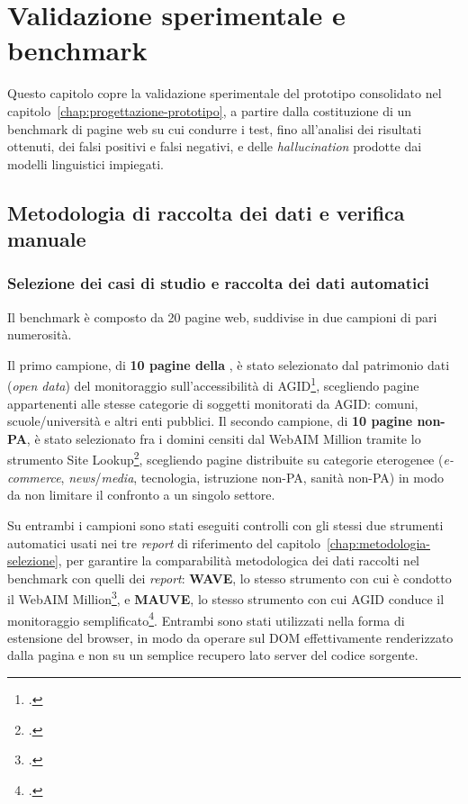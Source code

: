 \chapter{Validazione sperimentale e benchmark}
\label{chap:validazione-benchmark}

Questo capitolo copre la validazione sperimentale del prototipo consolidato nel capitolo~\ref{chap:progettazione-prototipo}, a partire dalla costituzione di un benchmark di pagine web su cui condurre i test, fino all'analisi dei risultati ottenuti, dei falsi positivi e falsi negativi, e delle \emph{hallucination} prodotte dai modelli linguistici impiegati.

\section{Metodologia di raccolta dei dati e verifica manuale}
\label{sec:metodologia-validazione}

\subsection{Selezione dei casi di studio e raccolta dei dati automatici}
\label{sec:selezione-siti-strumenti}

Il benchmark è composto da 20 pagine web, suddivise in due campioni di pari numerosità.

Il primo campione, di \textbf{10 pagine della }, è stato selezionato dal patrimonio dati (\emph{open data}) del monitoraggio sull'accessibilità di AGID\footcite{agid:opendata-monitoraggio}, scegliendo pagine appartenenti alle stesse categorie di soggetti monitorati da AGID: comuni, scuole/università e altri enti pubblici. Il secondo campione, di \textbf{10 pagine non-PA}, è stato selezionato fra i domini censiti dal WebAIM Million tramite lo strumento Site Lookup\footcite{webaim:sitelookup}, scegliendo pagine distribuite su categorie eterogenee (\emph{e-commerce}, \emph{news}/\emph{media}, tecnologia, istruzione non-PA, sanità non-PA) in modo da non limitare il confronto a un singolo settore.

Su entrambi i campioni sono stati eseguiti controlli con gli stessi due strumenti automatici usati nei tre \emph{report} di riferimento del capitolo~\ref{chap:metodologia-selezione}, per garantire la comparabilità metodologica dei dati raccolti nel benchmark con quelli dei \emph{report}: \textbf{WAVE}, lo stesso strumento con cui è condotto il WebAIM Million\footcite{wave:extension}, e \textbf{MAUVE}, lo stesso strumento con cui AGID conduce il monitoraggio semplificato\footcite{mauve:extension}. Entrambi sono stati utilizzati nella forma di estensione del browser, in modo da operare sul DOM effettivamente renderizzato dalla pagina e non su un semplice recupero lato server del codice sorgente.

